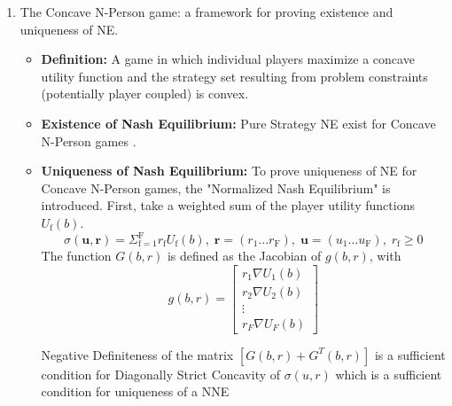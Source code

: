 \documentclass[12pt,a4paper]{report}
\begin{document}
\begin{enumerate}
\item The Concave N-Person game: a framework for proving existence and uniqueness of NE.

\begin{itemize}
\item
\textbf{Definition:} A game in which individual players maximize a concave utility function and the strategy set resulting from problem constraints (potentially player coupled) is convex. 
\item 
\textbf{Existence of Nash Equilibrium:} Pure Strategy NE exist for Concave N-Person  games \cite[Thm1]{rosen1964existence}. 
\item
\textbf{Uniqueness of Nash Equilibrium:} To prove uniqueness of NE for Concave N-Person  games, the "Normalized Nash Equilibrium" is introduced.
First, take a weighted sum of the player utility functions $U_{\mathrm{f}}(b)$.
\begin{equation}
\sigma(\mathbf{u},\mathbf{r})  = \Sigma_{\mathrm{f=1}}^{\mathrm{F}} r_{\mathrm{f}}U_{\mathrm{f}}(b),\; \mathbf{r}=(r_{\text{1}}... r_{\text{F}})
,\; \mathbf{u}=(u_{\text{1}}... u_{\text{F}})
, \; 
r_{\mathrm{f}} \geq 0
\end{equation}
 The function $G(b,r) $ is defined as the Jacobian of $g(b,r) $, with 
\begin{equation}
g(b,r)= 
\begin{bmatrix}
r_1 \nabla U_{1}(b)
\\
r_2 \nabla U_{2}(b)
\\
\vdots\\
r_F \nabla U_{F}(b)
\end{bmatrix}
\end{equation}


Negative Definiteness of the matrix $[G(b,r)+G^{T}(b,r)] $ is a sufficient condition for Diagonally Strict Concavity of $\sigma(u,r)$ which is a sufficient condition for uniqueness of a NNE \cite[Thm4]{rosen1964existence}



\end{itemize}
\end{enumerate}
\end{document}

